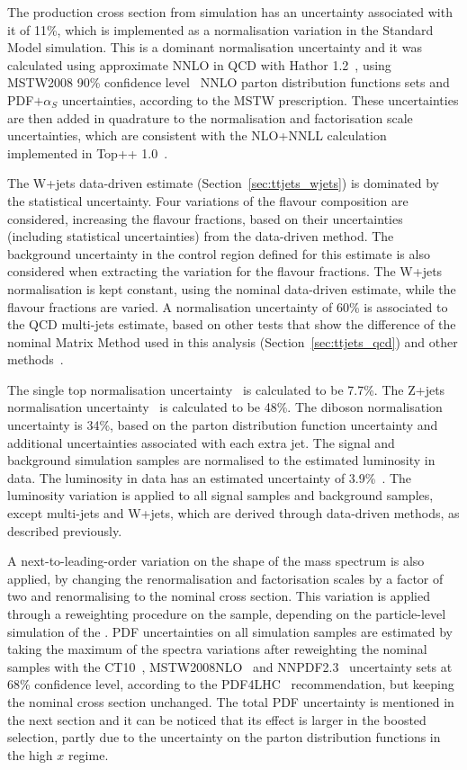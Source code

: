 The \ttbar production cross section from simulation has an uncertainty associated with it of 11\%, which is implemented as a normalisation variation in the Standard Model \ttbar
simulation. This is a dominant normalisation uncertainty and it was calculated using approximate NNLO in QCD with Hathor 1.2~\cite{hathor},
using MSTW2008 90\% confidence level~\cite{mstw}
NNLO parton distribution functions sets and PDF$+\alpha_S$ uncertainties, according to the MSTW prescription. These uncertainties are then added in quadrature
to the normalisation and factorisation scale uncertainties, which are consistent with the NLO+NNLL calculation implemented in Top++ 1.0~\cite{ttnorm1,hathor,pdflhc,alphaspdf,ttnnll,toppp}.

The W+jets data-driven estimate (Section~\ref{sec:ttjets_wjets}) is dominated by the statistical uncertainty.
Four variations of the flavour composition are considered, increasing the flavour
fractions, based on their uncertainties (including statistical uncertainties) from the data-driven method. The background uncertainty in the control region defined
for this estimate is also considered when extracting the variation for the flavour fractions. The W+jets normalisation is kept constant, using the nominal data-driven
estimate, while the flavour fractions are varied. A normalisation uncertainty of 60\% is associated  to the QCD multi-jets estimate, based on other tests that show
the difference of the nominal Matrix Method used in this analysis (Section~\ref{sec:ttjets_qcd}) and other methods~\cite{ttres7paper}.

The single top normalisation uncertainty~\cite{stop1,stop2,stop3} is calculated to be 7.7\%. The Z+jets normalisation uncertainty~\cite{ttxsec} is calculated to be 48\%.
The diboson normalisation uncertainty is 34\%, based on the parton distribution function uncertainty and additional uncertainties associated with each extra jet.
The signal and background simulation samples are normalised to the estimated luminosity in data. The luminosity in data has an estimated
uncertainty of 3.9\%~\cite{lumi}. The luminosity variation is applied to all signal samples and background samples, except multi-jets and W+jets, which
are derived through data-driven methods, as described previously.

A next-to-leading-order variation on the shape of the \ttbar mass spectrum is also applied, by changing the renormalisation and factorisation scales by a factor
of two and renormalising to the nominal \ttbar cross section. This variation is applied through a reweighting procedure on the \ttbar sample, depending on the particle-level
simulation of the \mtt. PDF uncertainties on all simulation samples are estimated by taking the maximum of the \mtt spectra variations after reweighting the nominal samples
with the CT10~\cite{ct10}, MSTW2008NLO~\cite{mstw} and NNPDF2.3~\cite{nnpdf} uncertainty sets at 68\% confidence level, according to the PDF4LHC~\cite{pdflhc} recommendation, but keeping the nominal cross section
unchanged. The total PDF uncertainty is mentioned in the next section and it can be noticed that its effect is larger in the boosted selection, partly due to the uncertainty
on the parton distribution functions in the high $x$ regime.

